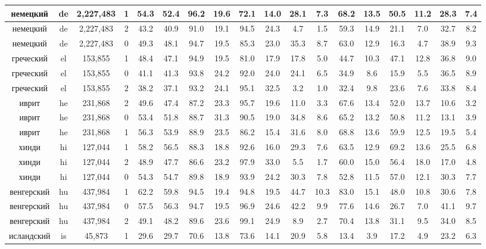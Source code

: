 \begin{table*}
{\begin{tabular}{|c|c|c|c||c|c|c|c|c|c|c|c|c|c|c|c|c|c|}
немецкий & de & 2,227,483 & 1 & 54.3 & 52.4 & 96.2 & 19.6 & 72.1 & 14.0 & 28.1 & 7.3 & 68.2 & 13.5 & 50.5 & 11.2 & 28.3 & 7.4\\ \hline
немецкий & de & 2,227,483 & 2 & 43.2 & 40.9 & 91.0 & 19.1 & 94.5 & 24.3 & 4.7 & 1.5 & 59.3 & 14.9 & 21.1 & 7.0 & 32.7 & 8.2\\ \hline
немецкий & de & 2,227,483 & 0 & 49.3 & 48.1 & 94.7 & 19.5 & 85.3 & 23.0 & 35.3 & 8.7 & 63.0 & 12.9 & 16.3 & 4.7 & 38.9 & 9.3\\ \hline
греческий & el & 153,855 & 1 & 48.4 & 47.1 & 94.9 & 19.5 & 81.0 & 17.9 & 17.8 & 5.0 & 44.7 & 10.3 & 47.1 & 12.8 & 36.8 & 9.0\\ \hline
греческий & el & 153,855 & 0 & 41.1 & 41.3 & 93.8 & 24.2 & 92.0 & 24.0 & 24.1 & 6.5 & 34.9 & 8.6 & 15.9 & 5.5 & 36.5 & 8.9\\ \hline
греческий & el & 153,855 & 2 & 38.2 & 37.1 & 93.2 & 24.1 & 95.1 & 32.5 & 3.2 & 1.0 & 32.4 & 9.8 & 23.6 & 7.6 & 33.8 & 8.4\\ \hline
иврит & he & 231,868 & 2 & 49.6 & 47.4 & 87.2 & 23.3 & 95.7 & 19.6 & 11.0 & 3.3 & 67.6 & 13.4 & 52.0 & 13.7 & 10.6 & 3.2\\ \hline
иврит & he & 231,868 & 0 & 53.4 & 51.8 & 88.7 & 31.3 & 90.5 & 19.0 & 34.8 & 8.6 & 65.2 & 13.2 & 50.8 & 11.2 & 13.1 & 3.9\\ \hline
иврит & he & 231,868 & 1 & 56.3 & 53.9 & 88.9 & 23.5 & 86.2 & 15.4 & 31.6 & 8.0 & 68.8 & 13.6 & 59.9 & 12.5 & 19.5 & 5.4\\ \hline
хинди & hi & 127,044 & 1 & 58.2 & 56.5 & 88.3 & 18.8 & 92.6 & 16.0 & 29.3 & 7.6 & 63.5 & 12.9 & 69.2 & 13.6 & 25.5 & 6.8\\ \hline
хинди & hi & 127,044 & 2 & 48.9 & 47.7 & 86.6 & 23.2 & 97.9 & 33.0 & 5.5 & 1.7 & 60.0 & 15.0 & 56.4 & 18.0 & 17.0 & 4.8\\ \hline
хинди & hi & 127,044 & 0 & 54.3 & 54.7 & 89.8 & 18.9 & 93.9 & 24.2 & 30.3 & 7.8 & 52.8 & 11.5 & 57.0 & 12.1 & 30.3 & 7.7\\ \hline
венгерский & hu & 437,984 & 1 & 62.2 & 59.8 & 94.5 & 19.4 & 94.8 & 19.5 & 44.7 & 10.3 & 83.0 & 15.1 & 48.0 & 10.8 & 30.6 & 7.8\\ \hline
венгерский & hu & 437,984 & 0 & 57.5 & 56.3 & 94.7 & 19.5 & 96.9 & 24.6 & 42.2 & 9.9 & 77.6 & 14.6 & 26.7 & 7.0 & 41.1 & 9.7\\ \hline
венгерский & hu & 437,984 & 2 & 49.1 & 48.2 & 89.6 & 23.6 & 99.1 & 24.9 & 8.9 & 2.7 & 70.4 & 13.8 & 31.1 & 9.5 & 34.0 & 8.5\\ \hline
исландский & is & 45,873 & 1 & 29.6 & 29.7 & 70.6 & 13.8 & 73.6 & 14.1 & 20.9 & 5.8 & 13.4 & 3.9 & 17.2 & 4.9 & 23.2 & 6.3\\ \hline

\end{tabular}}
\end{table*}
